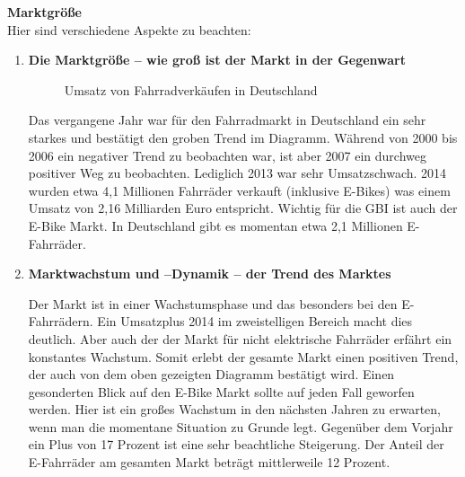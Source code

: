 \small{\textbf{Marktgröße}}\\
Hier sind verschiedene Aspekte zu beachten:
\begin{enumerate}

	\item \textbf{Die Marktgröße – wie groß ist der Markt in der Gegenwart}
	\begin{figure}[H]
		\begin{center}
		\end{center}
		\caption{Umsatz von Fahrradverkäufen in Deutschland}
	\end{figure}
	
Das vergangene Jahr war für den Fahrradmarkt in Deutschland ein sehr starkes und bestätigt den groben Trend im Diagramm. Während von 2000 bis 2006 ein negativer Trend zu beobachten war, ist aber 2007 ein durchweg positiver Weg zu beobachten. Lediglich 2013 war sehr Umsatzschwach. 2014 wurden etwa 4,1 Millionen Fahrräder verkauft (inklusive E-Bikes) was einem Umsatz von 2,16 Milliarden Euro entspricht. Wichtig für die GBI ist auch der E-Bike Markt. In Deutschland gibt es momentan etwa 2,1 Millionen E-Fahrräder.

	\item{\textbf{Marktwachstum und –Dynamik – der Trend des Marktes}}
	
Der Markt ist in einer Wachstumsphase und das besonders bei den E-Fahrrädern. Ein Umsatzplus 2014 im zweistelligen Bereich macht dies deutlich. Aber auch der der Markt für nicht elektrische Fahrräder erfährt ein konstantes Wachstum. Somit erlebt der gesamte Markt einen positiven Trend, der auch von dem oben gezeigten Diagramm bestätigt wird.
Einen gesonderten Blick auf den E-Bike Markt sollte auf jeden Fall geworfen werden. Hier ist ein großes Wachstum in den nächsten Jahren zu erwarten, wenn man die momentane Situation zu Grunde legt. Gegenüber dem Vorjahr ein Plus von 17 Prozent ist eine sehr beachtliche Steigerung. Der Anteil der E-Fahrräder am gesamten Markt beträgt mittlerweile 12 Prozent.


\end{enumerate}
